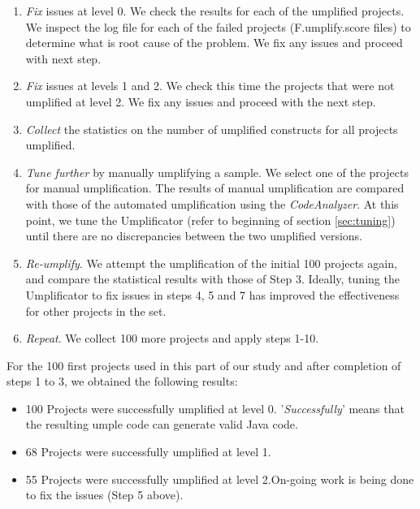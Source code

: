 \begin{enumerate}[resume]
\item \textit{Fix} issues at level 0. We check the results for each of the umplified projects. We inspect the log file for each of the failed projects (F.umplify.score files) to determine what is root cause of the problem. We fix any issues and proceed with next step.

\item \textit{Fix} issues at levels 1 and 2. We check this time the projects that were not umplified at level 2. We fix any issues and proceed with the next step.

\item \textit{Collect} the statistics on the number of umplified constructs for all projects umplified.

\item \textit{Tune further} by manually umplifying a sample. We select one of the projects for manual umplification. The results of manual umplification are compared with those of the automated umplification using the \textit{CodeAnalyzer}. At this point, we tune the Umplificator (refer to beginning of section \ref{sec:tuning}) until there are no discrepancies between the two umplified versions. 

\item \textit{Re-umplify}. We attempt the umplification of the initial 100 projects again, and compare the statistical results with those of Step 3. Ideally, tuning the Umplificator to fix issues in steps 4, 5 and 7 has improved the effectiveness for other projects in the set.

\item \textit{Repeat}. We collect 100 more projects and apply steps 1-10. 
\end{enumerate}

For the 100 first projects used in this part of our study and after completion of steps 1 to 3, we obtained the following results:

\begin{itemize}
\item 100 Projects were successfully umplified at level 0. '\textit{Successfully}' means that the resulting umple code can generate valid Java code.

\item 68 Projects were successfully umplified at level 1. 

\item 55 Projects were successfully umplified at level 2.On-going work is being done to fix the issues (Step 5 above).
\end{itemize}

